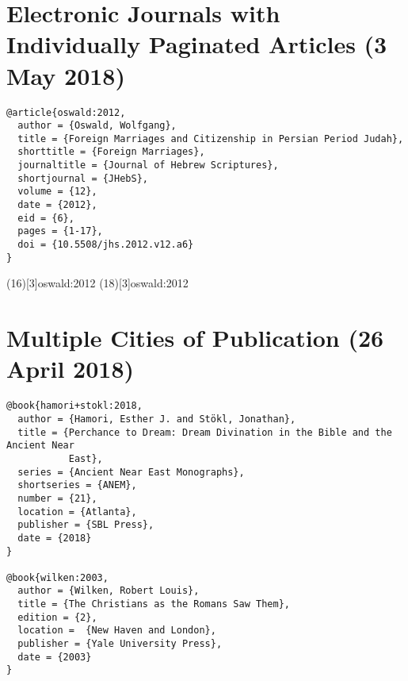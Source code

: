 \documentclass[a4paper]{article}
\begin{document}
\section{Electronic Journals with Individually Paginated Articles (3 May 2018)}

\begin{verbatim}
@article{oswald:2012,
  author = {Oswald, Wolfgang},
  title = {Foreign Marriages and Citizenship in Persian Period Judah},
  shorttitle = {Foreign Marriages},
  journaltitle = {Journal of Hebrew Scriptures},
  shortjournal = {JHebS},
  volume = {12},
  date = {2012},
  eid = {6},
  pages = {1-17},
  doi = {10.5508/jhs.2012.v12.a6}
}
\end{verbatim}

\examplecite(16)[3]{oswald:2012}
\examplecite(18)[3]{oswald:2012}
\exampleabbreviations
\examplebibliography

\section{Multiple Cities of Publication (26 April 2018)}

\begin{verbatim}
@book{hamori+stokl:2018,
  author = {Hamori, Esther J. and Stökl, Jonathan},
  title = {Perchance to Dream: Dream Divination in the Bible and the Ancient Near
           East},
  series = {Ancient Near East Monographs},
  shortseries = {ANEM},
  number = {21},
  location = {Atlanta},
  publisher = {SBL Press},
  date = {2018}
}

@book{wilken:2003,
  author = {Wilken, Robert Louis},
  title = {The Christians as the Romans Saw Them},
  edition = {2},
  location =  {New Haven and London},
  publisher = {Yale University Press},
  date = {2003}
}
\end{verbatim}

\exampleabbreviations
\examplebibliography
\end{document}
